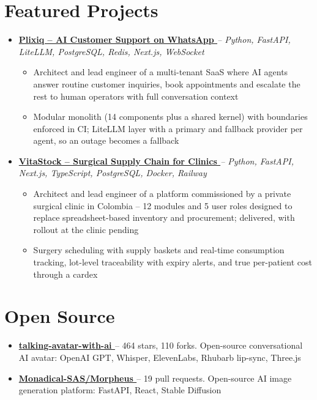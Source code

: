 \documentclass[letterpaper,10pt]{article}
\newcommand{\normalfaExternalLink}{{\mdseries\faExternalLink}}
\begin{document}
\section{Featured Projects}
\begin{itemize}[leftmargin=*, itemsep=2pt]
    \item \textbf{\href{https://plixiq.com}{Plixiq -- AI Customer Support on WhatsApp \normalfaExternalLink}} \textit{-- Python, FastAPI, LiteLLM, PostgreSQL, Redis, Next.js, WebSocket}
    \begin{itemize}[itemsep=0pt]
        \item Architect and lead engineer of a multi-tenant SaaS where AI agents answer routine customer inquiries, book appointments and escalate the rest to human operators with full conversation context
        \item Modular monolith (14 components plus a shared kernel) with boundaries enforced in CI; LiteLLM layer with a primary and fallback provider per agent, so an outage becomes a fallback
    \end{itemize}
    \item \textbf{\href{https://vitastock.piagents.dev}{VitaStock -- Surgical Supply Chain for Clinics \normalfaExternalLink}} \textit{-- Python, FastAPI, Next.js, TypeScript, PostgreSQL, Docker, Railway}
    \begin{itemize}[itemsep=0pt]
        \item Architect and lead engineer of a platform commissioned by a private surgical clinic in Colombia -- 12 modules and 5 user roles designed to replace spreadsheet-based inventory and procurement; delivered, with rollout at the clinic pending
        \item Surgery scheduling with supply baskets and real-time consumption tracking, lot-level traceability with expiry alerts, and true per-patient cost through a cardex
    \end{itemize}
\end{itemize}

\section{Open Source}
\begin{itemize}[leftmargin=*, itemsep=0pt]
    \item \textbf{\href{https://github.com/asanchezyali/talking-avatar-with-ai}{talking-avatar-with-ai \normalfaExternalLink}} -- 464 stars, 110 forks. Open-source conversational AI avatar: OpenAI GPT, Whisper, ElevenLabs, Rhubarb lip-sync, Three.js
    \item \textbf{\href{https://github.com/Monadical-SAS/Morpheus}{Monadical-SAS/Morpheus \normalfaExternalLink}} -- 19 pull requests. Open-source AI image generation platform: FastAPI, React, Stable Diffusion
\end{itemize}
\end{document}
